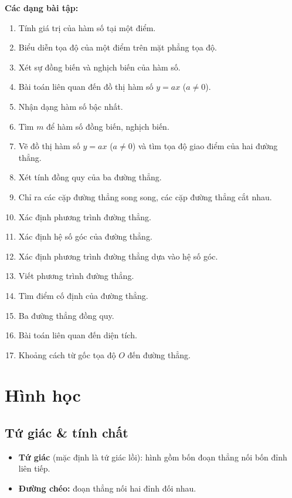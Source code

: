 \documentclass[12pt,a4paper]{article}
\begin{document}
\medskip\noindent\textbf{Các dạng bài tập:}
\begin{enumerate}[label=\textbf{Dạng \arabic*:}, leftmargin=*, align=left]
  \item Tính giá trị của hàm số tại một điểm.
  \item Biểu diễn tọa độ của một điểm trên mặt phẳng tọa độ.
  \item Xét sự đồng biến và nghịch biến của hàm số.
  \item Bài toán liên quan đến đồ thị hàm số $y = ax$ \;($a \ne 0$).
  \item Nhận dạng hàm số bậc nhất.
  \item Tìm $m$ để hàm số đồng biến, nghịch biến.
  \item Vẽ đồ thị hàm số $y = ax$ \;($a \ne 0$) và tìm tọa độ giao điểm của hai đường thẳng.
  \item Xét tính đồng quy của ba đường thẳng.
  \item Chỉ ra các cặp đường thẳng song song, các cặp đường thẳng cắt nhau.
  \item Xác định phương trình đường thẳng.
  \item Xác định hệ số góc của đường thẳng.
  \item Xác định phương trình đường thẳng dựa vào hệ số góc.
  \item Viết phương trình đường thẳng.
  \item Tìm điểm cố định của đường thẳng.
  \item Ba đường thẳng đồng quy.
  \item Bài toán liên quan đến diện tích.
  \item Khoảng cách từ gốc tọa độ $O$ đến đường thẳng.
\end{enumerate}

\newpage

\section{Hình học}

\subsection{Tứ giác \& tính chất}

\begin{dinhnghia}
  \begin{itemize}
    \item \textbf{Tứ giác} (mặc định là tứ giác lồi): hình gồm bốn đoạn thẳng nối bốn đỉnh liên tiếp.
    \item \textbf{Đường chéo:} đoạn thẳng nối hai đỉnh đối nhau.
  \end{itemize}
\end{dinhnghia}
\end{document}
